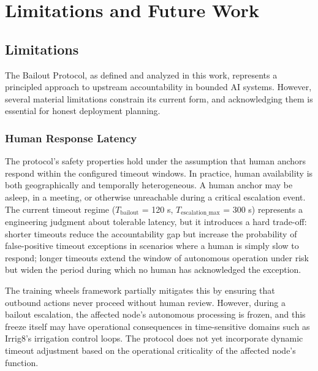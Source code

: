 \section{Limitations and Future Work}
\label{sec:limitations}

\subsection{Limitations}

The Bailout Protocol, as defined and analyzed in this work, represents a principled approach to upstream accountability in bounded AI systems. However, several material limitations constrain its current form, and acknowledging them is essential for honest deployment planning.

\subsubsection{Human Response Latency}
\label{sec:lim_human_latency}

The protocol's safety properties hold under the assumption that human anchors respond within the configured timeout windows. In practice, human availability is both geographically and temporally heterogeneous. A human anchor may be asleep, in a meeting, or otherwise unreachable during a critical escalation event. The current timeout regime ($T_{\text{bailout}}$ = 120 s, $T_{\text{escalation\_max}}$ = 300 s) represents a engineering judgment about tolerable latency, but it introduces a hard trade-off: shorter timeouts reduce the accountability gap but increase the probability of false-positive timeout exceptions in scenarios where a human is simply slow to respond; longer timeouts extend the window of autonomous operation under risk but widen the period during which no human has acknowledged the exception.

The training wheels framework partially mitigates this by ensuring that outbound actions never proceed without human review. However, during a bailout escalation, the affected node's autonomous processing is frozen, and this freeze itself may have operational consequences in time-sensitive domains such as Irrig8's irrigation control loops. The protocol does not yet incorporate dynamic timeout adjustment based on the operational criticality of the affected node's function.

